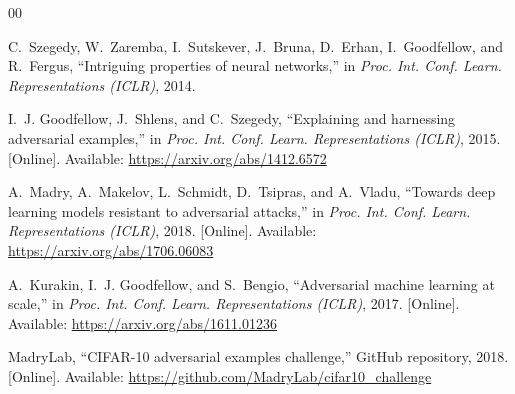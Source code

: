 \documentclass[conference,10pt]{IEEEtran}
\begin{document}
\begin{thebibliography}{00}

C.~Szegedy, W.~Zaremba, I.~Sutskever, J.~Bruna, D.~Erhan,
I.~Goodfellow, and R.~Fergus,
``Intriguing properties of neural networks,''
in \textit{Proc. Int. Conf. Learn. Representations (ICLR)}, 2014.

I.~J. Goodfellow, J.~Shlens, and C.~Szegedy,
``Explaining and harnessing adversarial examples,''
in \textit{Proc. Int. Conf. Learn. Representations (ICLR)}, 2015.
[Online]. Available: \url{https://arxiv.org/abs/1412.6572}

A.~Madry, A.~Makelov, L.~Schmidt, D.~Tsipras, and A.~Vladu,
``Towards deep learning models resistant to adversarial attacks,''
in \textit{Proc. Int. Conf. Learn. Representations (ICLR)}, 2018.
[Online]. Available: \url{https://arxiv.org/abs/1706.06083}

A.~Kurakin, I.~J. Goodfellow, and S.~Bengio,
``Adversarial machine learning at scale,''
in \textit{Proc. Int. Conf. Learn. Representations (ICLR)}, 2017.
[Online]. Available: \url{https://arxiv.org/abs/1611.01236}

MadryLab,
``CIFAR-10 adversarial examples challenge,''
GitHub repository, 2018.
[Online]. Available: \url{https://github.com/MadryLab/cifar10_challenge}

\end{thebibliography}
\end{document}

